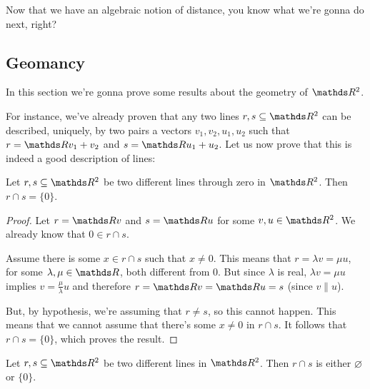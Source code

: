 Now that we have an algebraic notion of distance, you know what we're gonna do next, right?

\subsection{Geomancy}

In this section we're gonna prove some results about the geometry of $\R^2$.

For instance, we've already proven that any two lines $r,s\subseteq \R^2$ can be described, uniquely, by two pairs a vectors $v_1,v_2,u_1,u_2$ such that $r=\R v_1+v_2$ and $s=\R u_1+u_2$. Let us now prove that this is indeed a good description of lines:

\begin{prop}
	Let $r,s\subseteq \R^2$ be two different lines through zero in $\R^2$. Then $r\cap s=\{0\}$.
\end{prop}
\begin{proof}
	Let $r=\R v$ and $s=\R u$ for some $v,u\in \R^2$. We already know that $0\in r\cap s$.
	
	Assume there is some $x\in r\cap s$ such that $x\neq 0$. This means that $r=\lambda v=\mu u$, for some $\lambda,\mu\in\R$, both different from $0$. But since $\lambda$ is real, $\lambda v=\mu u$ implies $v=\frac{\mu}{\lambda }u$ and therefore $r=\R v=\R u=s$ (since $v\parallel u$).
	
	But, by hypothesis, we're assuming that $ r\neq s$, so this cannot happen. This means that we cannot assume that there's some $x\neq 0$ in $r\cap s$. It follows that $r\cap s=\{0\}$, which proves the result.
\end{proof}
\begin{cor}
	Let $r,s\subseteq \R^2$ be two different lines in $\R^2$. Then $r\cap s$ is either $\varnothing$ or $\{0\}$.
\end{cor}
